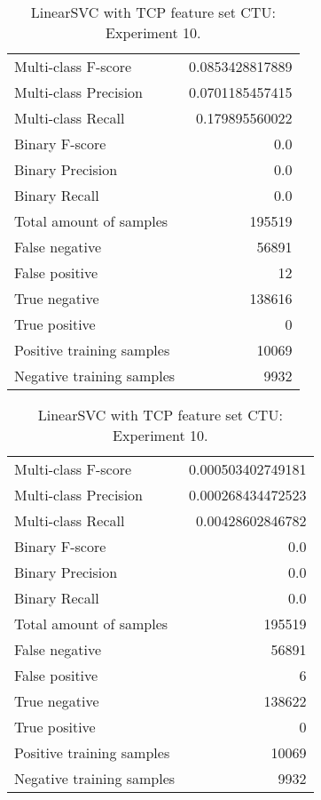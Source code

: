 \begin{table}[H]
\begin{minipage}{0.5\textwidth}
\caption{LinearSVC with TCP feature set CTU: Experiment 9.}
\centering
\begin{tabular}{l r}
\toprule
Multi-class F-score & 0.0853428817889 \\
Multi-class Precision & 0.0701185457415 \\
Multi-class Recall & 0.179895560022 \\
\midrule
Binary F-score & 0.0 \\
Binary Precision & 0.0 \\
Binary Recall & 0.0 \\
\midrule
Total amount of samples & 195519 \\
False negative & 56891 \\
False positive & 12 \\
True negative & 138616 \\
True positive & 0 \\
\midrule
Positive training samples & 10069 \\
Negative training samples & 9932 \\
\bottomrule
\end{tabular}
\end{minipage}
\hfillx
\begin{minipage}{0.5\textwidth}
\caption{LinearSVC with TCP feature set CTU: Experiment 10.}
\centering
\begin{tabular}{l r}
\toprule
Multi-class F-score & 0.000503402749181 \\
Multi-class Precision & 0.000268434472523 \\
Multi-class Recall & 0.00428602846782 \\
\midrule
Binary F-score & 0.0 \\
Binary Precision & 0.0 \\
Binary Recall & 0.0 \\
\midrule
Total amount of samples & 195519 \\
False negative & 56891 \\
False positive & 6 \\
True negative & 138622 \\
True positive & 0 \\
\midrule
Positive training samples & 10069 \\
Negative training samples & 9932 \\
\bottomrule
\end{tabular}
\end{minipage}
\end{table}
